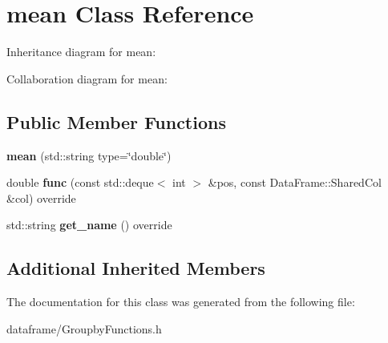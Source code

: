 \hypertarget{classmean}{}\section{mean Class Reference}
\label{classmean}


Inheritance diagram for mean\+:


Collaboration diagram for mean\+:
\subsection*{Public Member Functions}
\begin{DoxyCompactItemize}
\item 
\mbox{\label{classmean_ad564c130074cfd930dc03123f3de308c}} 
{\bfseries mean} (std\+::string type=\char`\"{}double\char`\"{})
\item 
\mbox{\label{classmean_aaf79a8b64ea62ed54cb46e1489702491}} 
double {\bfseries func} (const std\+::deque$<$ int $>$ \&pos, const Data\+Frame\+::\+Shared\+Col \&col) override
\item 
\mbox{\label{classmean_acbdb3b85d60c1fd182f752ace5dc356d}} 
std\+::string {\bfseries get\+\_\+name} () override
\end{DoxyCompactItemize}
\subsection*{Additional Inherited Members}


The documentation for this class was generated from the following file\+:\begin{DoxyCompactItemize}
\item 
dataframe/Groupby\+Functions.\+h\end{DoxyCompactItemize}

